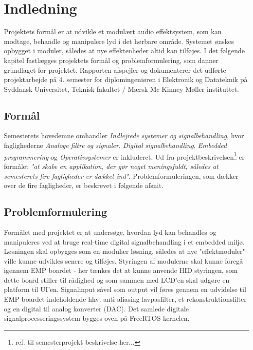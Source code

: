 \chapter{Indledning}
\vspace*{0.5 cm}
Projektets formål er at udvikle et modulært audio effektsystem, som kan modtage, behandle og manipulere lyd i det hørbare område. 
Systemet ønskes opbygget i moduler, således at nye effektenheder altid kan tilføjes. \newline
I det følgende kapitel fastlægges projektets formål og problemformulering, som danner grundlaget for projektet.
Rapporten afspejler og dokumenterer det udførte projektarbejde på 4. semester for diplomingeniøren i Elektronik og Datateknik på Syddansk Universitet, Teknisk fakultet / Mærsk Mc Kinney Møller instituttet.

\section{Formål}
Semesterets hovedemne omhandler \emph{Indlejrede systemer og signalbehandling}, hvor faglighederne \emph{Analoge filtre og signaler}, \emph{Digital signalbehandling}, \emph{Embedded programmering} og \emph{Operativsystemer} er inkluderet.
Ud fra projektbeskrivelsen\footnote{ref. til  semesterprojekt beskrivelse her...} er formålet\textit{ "at skabe en applikation, der gør noget meningsfuldt, således at semesterets fire fagligheder er dækket ind"}. \newline
Problemformuleringen, som dækker over de fire fagligheder, er beskrevet i følgende afsnit. 


\section{Problemformulering}
Formålet med projektet er at undersøge, hvordan lyd kan behandles og manipuleres ved at bruge real-time digital signalbehandling i et embedded miljø.
Løsningen skal opbygges som en modulær løsning, således at nye "effektmoduler" ville kunne udvikles senere og tilføjes.  
Styringen af modulerne skal kunne foregå igennem EMP boardet - her tænkes det at kunne anvende HID styringen, som dette board stiller til rådighed og som sammen med LCD'en skal udgøre en platform til UI'en. 
Signalinput såvel som output vil føres gennem en udvidelse til EMP-boardet indeholdende hhv. anti-aliasing lavpasfilter, et rekonstruktionsfilter og en digital til analog konverter (DAC).
Det samlede digitale signalprocesseringssystem bygges oven på FreeRTOS kernelen.

